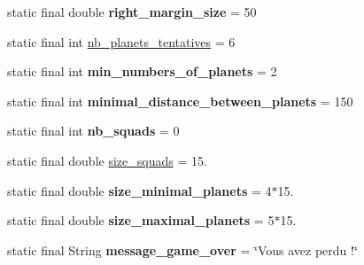 \begin{DoxyCompactItemize}
\item 
\mbox{\label{classfr_1_1groupe40_1_1projet_1_1util_1_1_constantes_a88253d831700a561a099bccfe95fd11d}} 
static final double {\bfseries right\+\_\+margin\+\_\+size} = 50
\item 
static final int \mbox{\hyperlink{classfr_1_1groupe40_1_1projet_1_1util_1_1_constantes_a8e2d019fc2eedd9b61a3d82994e35d9f}{nb\+\_\+planets\+\_\+tentatives}} = 6
\item 
\mbox{\label{classfr_1_1groupe40_1_1projet_1_1util_1_1_constantes_a513ae64f34612eecfd202303918ae2fb}} 
static final int {\bfseries min\+\_\+numbers\+\_\+of\+\_\+planets} = 2
\item 
\mbox{\label{classfr_1_1groupe40_1_1projet_1_1util_1_1_constantes_a0cecc142100d00b8e40fb64575bd044f}} 
static final int {\bfseries minimal\+\_\+distance\+\_\+between\+\_\+planets} = 150
\item 
\mbox{\label{classfr_1_1groupe40_1_1projet_1_1util_1_1_constantes_a9b95b16149e38031c079a607a5d301ad}} 
static final int {\bfseries nb\+\_\+squads} = 0
\item 
static final double \mbox{\hyperlink{classfr_1_1groupe40_1_1projet_1_1util_1_1_constantes_a841b2f722e23d84cc2a49c2577d30e66}{size\+\_\+squads}} = 15.
\item 
\mbox{\label{classfr_1_1groupe40_1_1projet_1_1util_1_1_constantes_a04b2499b2e22521241aff510909bf2fa}} 
static final double {\bfseries size\+\_\+minimal\+\_\+planets} = 4$\ast$15.
\item 
\mbox{\label{classfr_1_1groupe40_1_1projet_1_1util_1_1_constantes_a4a5ef9ca60ae7c8668bfddbb6d1853b3}} 
static final double {\bfseries size\+\_\+maximal\+\_\+planets} = 5$\ast$15.
\item 
\mbox{\label{classfr_1_1groupe40_1_1projet_1_1util_1_1_constantes_a2d9a2b3fc75edb737987063ab014c22e}} 
static final String {\bfseries message\+\_\+game\+\_\+over} = \char`\"{}Vous avez perdu !\char`\"{}

\end{DoxyCompactItemize}
